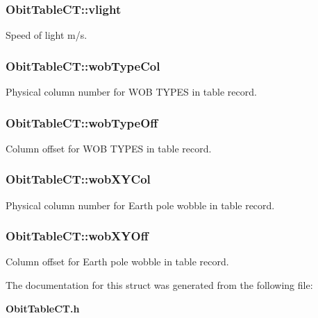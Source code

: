 \subsubsection{ {\bf Obit\-Table\-CT::vlight}}\label{structObitTableCT_o46}


Speed of light m/s. 

\subsubsection{ {\bf Obit\-Table\-CT::wob\-Type\-Col}}\label{structObitTableCT_o58}


Physical column number for WOB TYPES in table record. 

\subsubsection{ {\bf Obit\-Table\-CT::wob\-Type\-Off}}\label{structObitTableCT_o57}


Column offset for WOB TYPES in table record. 

\subsubsection{ {\bf Obit\-Table\-CT::wob\-XYCol}}\label{structObitTableCT_o68}


Physical column number for Earth pole wobble in table record. 

\subsubsection{ {\bf Obit\-Table\-CT::wob\-XYOff}}\label{structObitTableCT_o67}


Column offset for Earth pole wobble in table record. 



The documentation for this struct was generated from the following file:\begin{CompactItemize}
\item 
{\bf Obit\-Table\-CT.h}\end{CompactItemize}
